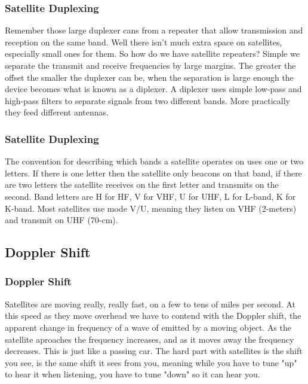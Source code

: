 \documentclass[10pt]{beamer}
\begin{document}
\begin{frame}
\frametitle{Satellite Duplexing}
Remember those large duplexer cans from a repeater that allow transmission and reception on the same band. Well there isn't much extra space on satellites, especially small ones for them. So how do we have satellite repeaters? Simple we separate the transmit and receive frequencies by large margins. The greater the offset the smaller the duplexer can be, when the separation is large enough the device becomes what is known as a diplexer. A diplexer uses simple low-pass and high-pass filters to separate signals from two different bands. More practically they feed different antennas.
\end{frame}

\begin{frame}
\frametitle{Satellite Duplexing}
The convention for describing which bands a satellite operates on uses one or two letters. If there is one letter then the satellite only beacons on that band, if there are two letters the satellite receives on the first letter and transmits on the second. Band letters are H for HF, V for VHF, U for UHF, L for L-band, K for K-band.  Most satellites use mode V/U, meaning they listen on VHF (2-meters) and transmit on UHF (70-cm).
\end{frame}

\subsection{Doppler Shift}
\begin{frame}
\frametitle{Doppler Shift}
Satellites are moving really, really fast, on a few to tens of miles per second. At this speed as they move overhead we have to contend with the Doppler shift, the apparent change in frequency of a wave of emitted by a moving object. As the satellite aproaches the frequency increases, and as it moves away the frequency decreases. This is just like a passing car. The hard part with satellites is the shift you see, is the same shift it sees from you, meaning while you have to tune "up" to hear it when listening, you have to tune "down" so it can hear you.
\end{frame}
\end{document}
